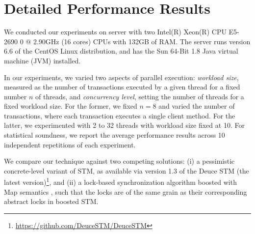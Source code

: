 \section{Detailed Performance Results}
\label{Se:perf}


%
We conducted our experiments on server with two Intel(R) Xeon(R) CPU E5-2690 0 @ 2.90GHz (16 cores) CPUs with 132GB of RAM. The server runs version
6.6 of the CentOS Linux distribution, and has the Sun 64-Bit 1.8 Java virtual machine (JVM) installed.

In our experiments, we varied two aspects of parallel execution: \emph{workload size}, measured as the number of transactions executed by a given thread for a fixed number $n$ of threads, and \emph{concurrency level}, setting the number of threads for a fixed workload size. For the former, we fixed $n=8$ and varied the number of transactions, where each transaction executes a single client method. For the latter, we experimented with 2 to 32 threads with workload size fixed at 10.
For statistical soundness, we report the average performance results across 10 independent repetitions of each experiment.

We compare our technique against two competing solutions: (i) a pessimistic concrete-level variant of STM, as available via version 1.3 of the Deuce STM (the latest version)\footnote{
		\url{https://github.com/DeuceSTM/DeuceSTM}
	}, and (ii)  a lock-based synchronization algorithm boosted with {\sf Map} semantics \cite{ppopp/HerlihyK08}, such that the locks are of the same grain as their corresponding abstract locks in boosted STM.

